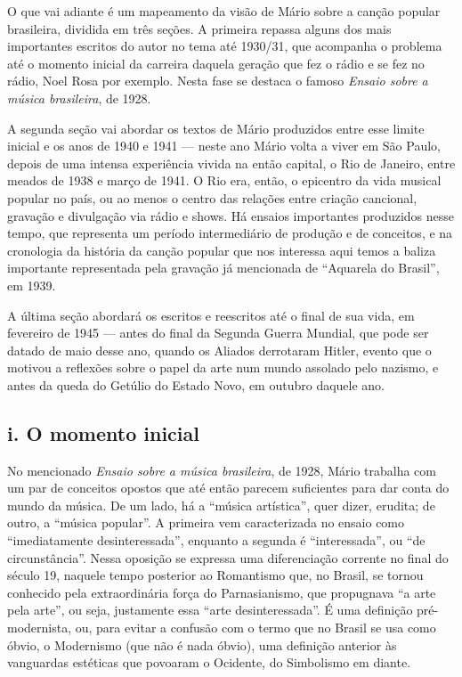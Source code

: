 O que vai adiante é um mapeamento da visão de Mário sobre a canção
popular brasileira, dividida em três seções. A primeira repassa alguns
dos mais importantes escritos do autor no tema até 1930/31, que
acompanha o problema até o momento inicial da carreira daquela geração
que fez o rádio e se fez no rádio, Noel Rosa por exemplo. Nesta fase se
destaca o famoso \emph{Ensaio sobre a música brasileira}, de 1928.

A segunda seção vai abordar os textos de Mário produzidos entre esse
limite inicial e os anos de 1940 e 1941 --- neste ano Mário volta a viver
em São Paulo, depois de uma intensa experiência vivida na então capital,
o Rio de Janeiro, entre meados de 1938 e março de 1941. O Rio era,
então, o epicentro da vida musical popular no país, ou ao menos o centro
das relações entre criação cancional, gravação e divulgação via rádio e
shows. Há ensaios importantes produzidos nesse tempo, que representa um
período intermediário de produção e de conceitos, e na cronologia da
história da canção popular que nos interessa aqui temos a baliza
importante representada pela gravação já mencionada de ``Aquarela do
Brasil'', em 1939.

A última seção abordará os escritos e reescritos até o final de sua
vida, em fevereiro de 1945 --- antes do final da Segunda Guerra Mundial,
que pode ser datado de maio desse ano, quando os Aliados derrotaram
Hitler, evento que o motivou a reflexões sobre o papel da arte num mundo
assolado pelo nazismo, e antes da queda do Getúlio do Estado Novo, em
outubro daquele ano.

\subsection{i. O momento inicial}

No mencionado \emph{Ensaio sobre a música brasileira}, de 1928, Mário
trabalha com um par de conceitos opostos que até então parecem
suficientes para dar conta do mundo da música. De um lado, há a ``música
artística'', quer dizer, erudita; de outro, a ``música popular''. A
primeira vem caracterizada no ensaio como ``imediatamente
desinteressada'', enquanto a segunda é ``interessada'', ou ``de
circunstância''. Nessa oposição se expressa uma diferenciação corrente
no final do século 19, naquele tempo posterior ao Romantismo que, no
Brasil, se tornou conhecido pela extraordinária força do Parnasianismo,
que propugnava ``a arte pela arte'', ou seja, justamente essa ``arte
desinteressada''. É uma definição pré-modernista, ou, para evitar a
confusão com o termo que no Brasil se usa como óbvio, o Modernismo (que
não é nada óbvio), uma definição anterior às vanguardas estéticas que
povoaram o Ocidente, do Simbolismo em diante.

